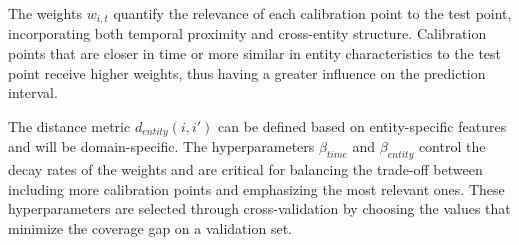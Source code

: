 The weights $w_{i,t}$ quantify the relevance of each calibration point to the test point, incorporating both temporal proximity and cross-entity structure. Calibration points that are closer in time or more similar in entity characteristics to the test point receive higher weights, thus having a greater influence on the prediction interval.

The distance metric $d_{entity}(i, i')$ can be defined based on entity-specific features and will be domain-specific. The hyperparameters $\beta_{time}$ and $\beta_{entity}$ control the decay rates of the weights and are critical for balancing the trade-off between including more calibration points and emphasizing the most relevant ones. These hyperparameters are selected through cross-validation by choosing the values that minimize the coverage gap on a validation set.

